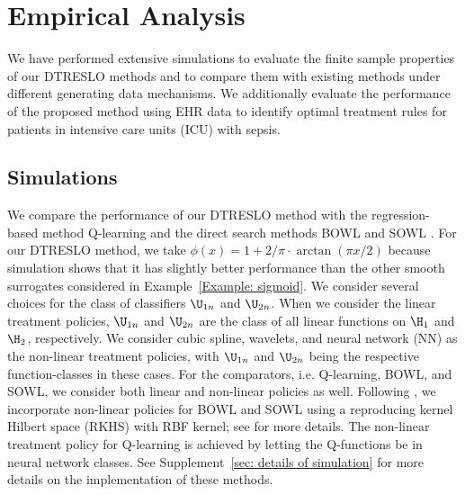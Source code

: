 \documentclass[preprint] {imsart}
\begin{document}
     
     


\section{Empirical Analysis}\label{section: simulation & application}
We have performed extensive simulations to evaluate the finite sample properties of our DTRESLO methods and to compare them with existing methods under different generating data mechanisms. We additionally evaluate the performance of the proposed method using EHR data to identify optimal treatment rules for patients in intensive care units (ICU) with sepsis.

\subsection{Simulations}
\label{sec: simulation}

We compare the performance of our DTRESLO method with the regression-based method Q-learning and the direct search methods BOWL and SOWL \citep{zhao2015}.
For our DTRESLO method, we take $\phi(x)=1+2/\pi \cdot \arctan(\pi x/2)$ because simulation shows that it has slightly better performance than the other smooth surrogates considered in Example~\ref{Example: sigmoid}. We consider several choices for the class of classifiers $\U_{1n}$ and $\U_{2n}$. When we consider the linear treatment policies,  $\U_{1n}$ and $\U_{2n}$ are the class of all linear functions on $\H_1$ and $\H_2$, respectively. We consider
 cubic spline, wavelets, and neural network (NN)  as the non-linear treatment policies, with  $\U_{1n}$ and $\U_{2n}$ being the respective function-classes in these cases. For the comparators, i.e. Q-learning, BOWL, and SOWL, we consider both linear  and non-linear policies  as well. Following \cite{zhao2015}, we incorporate non-linear policies  for  BOWL and SOWL using a reproducing kernel Hilbert space (RKHS) with  RBF kernel; see \cite{zhao2015} for more  details. The non-linear treatment policy for Q-learning is achieved by letting the  Q-functions be in neural network classes.  See Supplement~\ref{sec: details of simulation} for more details on the implementation of these methods.
 
\end{document}
